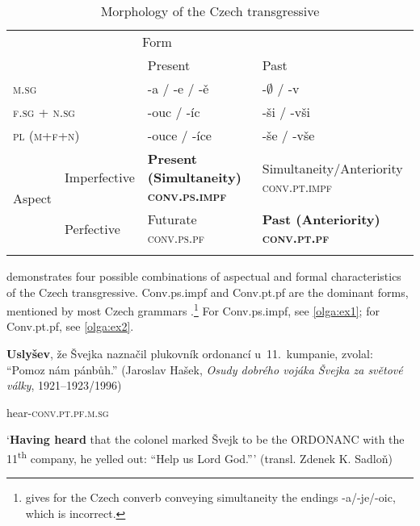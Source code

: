 \documentclass[output=paper,russian]{langsci/langscibook}
\begin{document}
\begin{table}\caption{Morphology of the Czech transgressive}\label{olga:t1}
  \begin{tabularx}{\textwidth}{Xlp{37mm}p{37mm}}
    \lsptoprule
    \multicolumn{2}{l}{\multirow{2}{35mm}{Czech transgressive forms}}  & \multicolumn{2}{c}{Form}\\
                            &                                       & Present                                               & Past\\
    \midrule
    \multicolumn{2}{l}{\textsc{m.sg}}                               & -a / -e / -ě                                          & -${\emptyset}$ / -v\\
    \multicolumn{2}{l}{\textsc{f.sg} + \textsc{n.sg}}               & -ouc / -íc                                            & -ši / -vši\\
    \multicolumn{2}{l}{\textsc{pl} (\textsc{m+f+n})}                & -ouce / -íce                                          & -še / -vše\\
    \midrule
    \multirow{2}{*}{Aspect} & Imperfective                          & \textbf{Present (Simultaneity) \textsc{conv.ps.impf}} & Simultaneity/Anteriority \textsc{conv.pt.impf}\\
                            & Perfective                            & Futurate \textsc{conv.ps.pf}                          & \textbf{Past (Anteriority) \textsc{conv.pt.pf}}\\
    \lspbottomrule
  \end{tabularx}
\end{table}


 demonstrates four possible combinations of aspectual and formal characteristics of the Czech transgressive. Conv.ps.impf and Conv.pt.pf are the dominant forms, mentioned by most Czech grammars \parencites[e.g.][154]{komarek86}[148--249]{cvrcek10}[or][335--337]{karetal95}.\footnote{\textcite[437]{nedjalkov98} gives for the Czech converb conveying simultaneity the endings -a/-je/-oic, which is incorrect.} For Conv.ps.impf, see \ref{olga:ex1}; for Conv.pt.pf, see \ref{olga:ex2}.

\begin{exe}
  \ex \textbf{Uslyšev}, že Švejka naznačil plukovník ordonancí u 11. kumpanie, zvolal: \enquote{Pomoz nám pánbůh.} (Jaroslav Hašek, \textit{Osudy dobrého vojáka Švejka za světové války}, 1921–1923/1996)\label{olga:ex2}
  
  hear-\textsc{conv.pt.pf.m.sg}

  `\textbf{Having heard} that the colonel marked Švejk to be the ORDONANC with the 11\textsuperscript{th} company, he yelled out: ``Help us Lord God.''' (transl. Zdenek K. Sadloň)
\end{exe}
\end{document}
